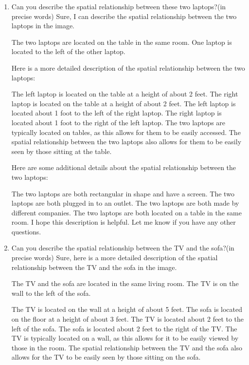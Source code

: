 \begin{enumerate}
    \item Can you describe the spatial relationship between these two laptops?(in precise words)
    \subitem Sure, I can describe the spatial relationship between the two laptops in the image.

    The two laptops are located on the table in the same room. One laptop is located to the left of the other laptop.
    
    Here is a more detailed description of the spatial relationship between the two laptops:
    
    The left laptop is located on the table at a height of about 2 feet.
    The right laptop is located on the table at a height of about 2 feet.
    The left laptop is located about 1 foot to the left of the right laptop.
    The right laptop is located about 1 foot to the right of the left laptop.
    The two laptops are typically located on tables, as this allows for them to be easily accessed. The spatial relationship between the two laptops also allows for them to be easily seen by those sitting at the table.
    
    Here are some additional details about the spatial relationship between the two laptops:
    
    The two laptops are both rectangular in shape and have a screen.
    The two laptops are both plugged in to an outlet.
    The two laptops are both made by different companies.
    The two laptops are both located on a table in the same room.
    I hope this description is helpful. Let me know if you have any other questions.
    \item Can you describe the spatial relationship between the TV and the sofa?(in precise words)
    \subitem 
    Sure, here is a more detailed description of the spatial relationship between the TV and the sofa in the image.
    
    The TV and the sofa are located in the same living room. The TV is on the wall to the left of the sofa.
    
    The TV is located on the wall at a height of about 5 feet.
    The sofa is located on the floor at a height of about 3 feet.
    The TV is located about 2 feet to the left of the sofa.
    The sofa is located about 2 feet to the right of the TV.
    The TV is typically located on a wall, as this allows for it to be easily viewed by those in the room. The spatial relationship between the TV and the sofa also allows for the TV to be easily seen by those sitting on the sofa.
    

\end{enumerate}
